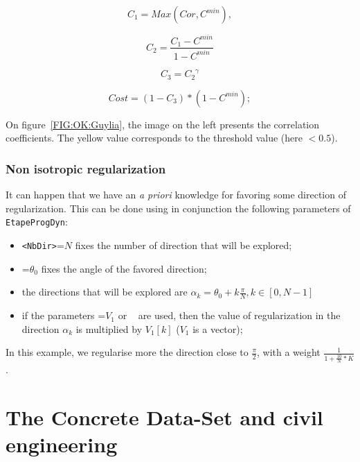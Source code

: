 \begin{equation}
    C_1=Max(Cor,C^{min}) ,
\end{equation}

\begin{equation}
   C_2 = \frac{C_1 -C^{min}}{1-C^{min}}
\end{equation}

\begin{equation}
   C_3 = {C_2} ^\gamma
\end{equation}

\begin{equation}
   Cost  = (1-C_3) * (1-C^{min});
\end{equation}

On figure~\ref{FIG:OK:Guylia}, the image on the left presents the correlation coefficients. The yellow value corresponds to the threshold value (here $<0.5$).


\subsubsection{Non isotropic regularization}

It can happen that we have an \emph{a priori} knowledge for favoring some direction of regularization.
This can be done using in conjunction the following parameters of {\tt EtapeProgDyn}:

\begin{itemize}
   \item  {\tt  <NbDir>}=$N$  fixes the number of direction that will be explored;
   \item  {\tt  <Teta0>}=$\theta_0$  fixes the angle of the favored direction;
   \item  the directions that will be explored are $\alpha_k=\theta_0 + k\frac{\pi}{N} , k\in[0,N-1]$
   \item if the parameters  {\tt <Px1MultRegul>}=$V_1$ or {\tt <Px2MultRegul> } are used, then the value
         of regularization in the direction  $\alpha_k$ is  multiplied by $V_1[k]$ ($V_1$ is a vector);
\end{itemize}

In this example, we regularise more the direction close to $\frac{\pi}{2}$, with a weight
$\frac{1}{1+\frac{10}{N}*K}$.



\section{The Concrete Data-Set and civil engineering}

